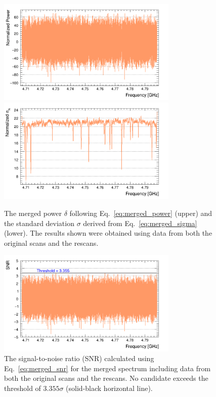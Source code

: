 \begin{figure}[h]
    \centering
    \includegraphics[width=8.6cm]{figures/Power_GrandSpectrum_AxionRun_AllSteps_Rescan_Merged_5bin_SG4_W201_LqWeight.png}
    \includegraphics[width=8.6cm]{figures/Sigma_GrandSpectrum_AxionRun_AllSteps_Rescan_Merged_5bin_SG4_W201_LqWeight.png}
    \caption{The merged power $\delta$ following Eq.~\eqref{eq:merged_power} 
(upper) and the standard deviation $\sigma$ derived from Eq.~\eqref{eq:merged_sigma} (lower). The results shown were obtained using data from both the 
original scans and the rescans.}
    \label{fig:power_sigma_merged}
\end{figure}

\begin{figure}[hbt!]
    \centering
    \includegraphics[width=8.6cm]{figures/SNR_GrandSpectrum_AxionRun_AllSteps_Rescan_Merged_5bin_SG4_W201_LqWeight.png}
    \caption{The signal-to-noise ratio (SNR) calculated using Eq.~\eqref{eq:merged_snr} for the merged spectrum including data from both the original 
scans and the rescans. No candidate exceeds the threshold of 
$3.355\sigma$ (solid-black horizontal line). }
    \label{fig:SNR_merged}
\end{figure}

